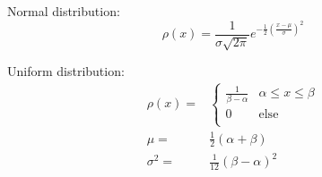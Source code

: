 			\noindent
			Normal distribution:
			\begin{equation}
				\rho(x)=\frac{1}{\sigma\sqrt{2\pi}}e^{-\frac{1}{2}\left(\frac{x-\mu}{\sigma}\right)^2}
			\end{equation}

			\noindent
			Uniform distribution:
			\begin{equation}
				\begin{aligned}
					\rho(x) =& \left\{\begin{array}{ll}
					\frac{1}{\beta-\alpha} & \alpha\le x\le \beta \\
					0 & \text{else} \\
					\end{array}\right. \\
					\mu =& \frac{1}{2}(\alpha+\beta) \\
					\sigma^2 =& \frac{1}{12}(\beta-\alpha)^2 \\
				\end{aligned}
			\end{equation}
